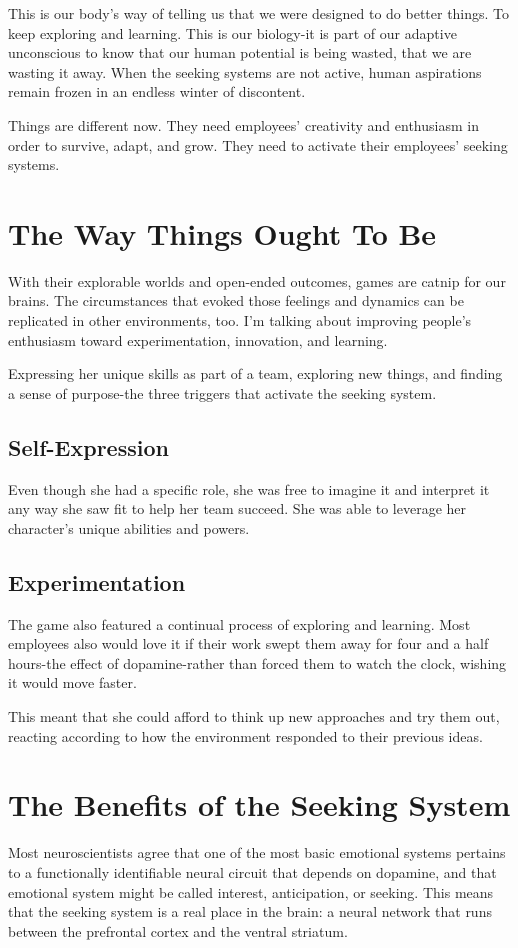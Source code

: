 \documentclass[ebook,12pt,oneside,openany]{memoir}
\begin{document}
This is our body's way of telling us that we were designed to do better things.
To keep exploring and learning. This is our biology-it is part of our adaptive unconscious to know
that our human potential is being wasted, that we are wasting it away.
When the seeking systems are not active, human aspirations remain frozen in an endless winter of discontent.

Things are different now. They need employees' creativity and enthusiasm in order to survive, 
adapt, and grow. They need to activate their employees' seeking systems.

\section{The Way Things Ought To Be}
With their explorable worlds and open-ended outcomes, games are catnip for our brains.
The circumstances that evoked those feelings and dynamics can be replicated in other environments, too.
I'm talking about improving people's enthusiasm toward experimentation, innovation, and learning.

Expressing her unique skills as part of a team, exploring new things,
and finding a sense of purpose-the three triggers that activate the seeking system.

\subsection{Self-Expression}
Even though she had a specific role, she was free to imagine it and interpret it 
any way she saw fit to help her team succeed.
She was able to leverage her character's unique abilities and powers.

\subsection{Experimentation}
The game also featured a continual process of exploring and learning.
Most employees also would love it if their work swept them away for four 
and a half hours-the effect of dopamine-rather than forced them to watch the clock,
wishing it would move faster.

This meant that she could afford to think up new approaches and try them out,
reacting according to how the environment responded to their previous ideas.

\section{The Benefits of the Seeking System}
Most neuroscientists agree that one of the most basic emotional systems pertains to a functionally identifiable
neural circuit that depends on dopamine, and that emotional system might be called interest, anticipation, or seeking.
This means that the seeking system is a real place in the brain:
a neural network that runs between the prefrontal cortex and the ventral striatum.
\end{document}
